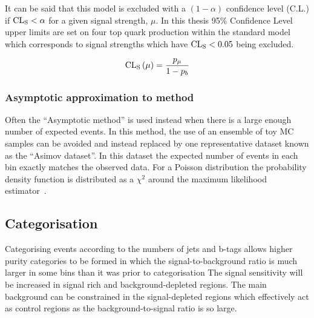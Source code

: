 It can be said that this model is excluded with a $\left(1-\alpha \right)$ confidence level (C.L.) if ${\textrm{CL}}_{\textrm{S}} < \alpha$ for a given signal strength, $\mu$. In this thesis 95\% Confidence Level upper limits are set on four top quark production within the standard model which corresponds to signal strengths which have ${\textrm{CL}}_{\textrm{S}} < 0.05$ being excluded.

\begin{equation}
{\textrm{CL}}_{\textrm{S}}\left(\mu\right) = \frac{p_{\mu}}{1-p_{b}}
\label{eqn:CLS}
\end{equation}





\subsubsection{Asymptotic approximation to \CLS method}
Often the ``Asymptotic \CLS method'' is used instead when there is a large enough number of expected events. In this method, the use of an ensemble of toy MC samples can be avoided and instead replaced by one representative dataset known as the ``Asimov dataset''. In this dataset the expected number of events in each bin exactly matches the observed data. For a Poisson distribution the probability density function is distributed as a $\chi^2$ around the maximum likelihood estimator~\cite{Cowan:2011js}. 





\subsection{Categorisation}
\label{sec:Cats}

Categorising events according to the numbers of jets and b-tags allows higher purity categories to be formed in which the signal-to-background ratio is much larger in some bins than it was prior to categorisation The signal sensitivity will be increased in signal rich and background-depleted regions. The main \ttbar background can be constrained in the signal-depleted regions which effectively act as control regions as the background-to-signal ratio is so large. 




